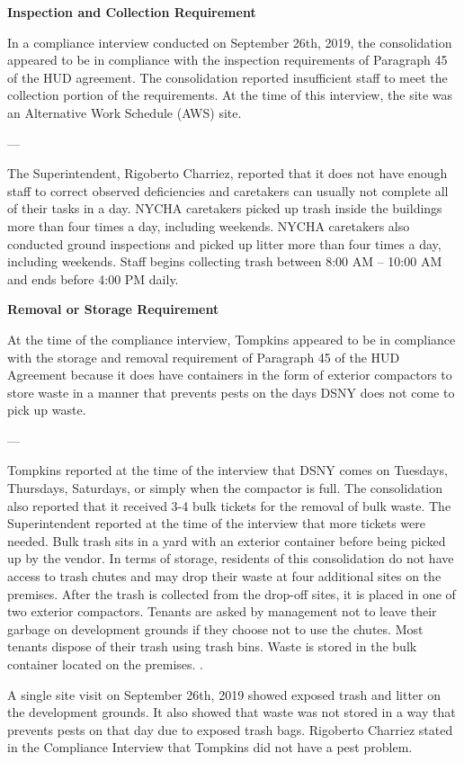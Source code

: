 

\textbf{Inspection and Collection Requirement}

In a compliance interview conducted on September 26th, 2019, the consolidation appeared to be in compliance with the inspection requirements of Paragraph 45 of the HUD agreement. The consolidation reported insufficient staff to meet the collection portion of the requirements. At the time of this interview, the site was an Alternative Work Schedule (AWS) site. 

---

The Superintendent, Rigoberto Charriez, reported that it does not have enough staff to correct observed deficiencies and caretakers can usually not complete all of their tasks in a day. NYCHA caretakers picked up trash inside the buildings more than four times a day, including weekends. NYCHA caretakers also conducted ground inspections and picked up litter more than four times a day, including weekends. Staff begins collecting trash between 8:00 AM -- 10:00 AM and ends before 4:00 PM daily.

\textbf{Removal or Storage Requirement}

At the time of the compliance interview, Tompkins appeared to be in compliance with the storage and removal requirement of Paragraph 45 of the HUD Agreement because it does have containers in the form of exterior compactors to store waste in a manner that prevents pests on the days DSNY does not come to pick up waste. 

---

Tompkins reported at the time of the interview that DSNY comes on Tuesdays, Thursdays, Saturdays, or simply when the compactor is full. The consolidation also reported that it received 3-4 bulk tickets for the removal of bulk waste. The Superintendent reported at the time of the interview that more tickets were needed. Bulk trash sits in a yard with an exterior container before being picked up by the vendor. In terms of storage, residents of this consolidation do not have access to trash chutes and may drop their waste at four additional sites on the premises. After the trash is collected from the drop-off sites, it is placed in one of two exterior compactors. Tenants are asked by management not to leave their garbage on development grounds if they choose not to use the chutes. Most tenants dispose of their trash using trash bins. Waste is stored in the bulk container located on the premises. . 

A single site visit on September 26th, 2019 showed exposed trash and litter on the development grounds. It also showed that waste was not stored in a way that prevents pests on that day due to exposed trash bags. Rigoberto Charriez stated in the Compliance Interview that Tompkins did not have a pest problem.

